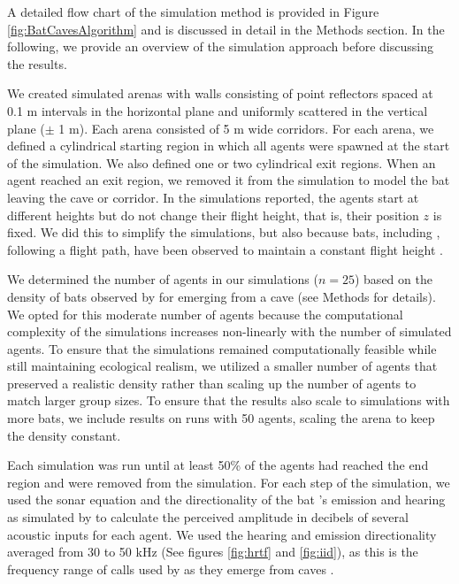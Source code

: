\documentclass[a4paper, 11pt]{article}
\begin{document}
A detailed flow chart of the simulation method is provided in Figure \ref{fig:BatCavesAlgorithm} and is discussed in detail in the Methods section. In the following, we provide an overview of the simulation approach before discussing the results.

We created simulated arenas with walls consisting of point reflectors spaced at 0.1 m intervals in the horizontal plane and uniformly scattered in the vertical plane ($\pm$ 1 m). Each arena consisted of 5 m wide corridors. For each arena, we defined a cylindrical starting region in which all agents were spawned at the start of the simulation. We also defined one or two cylindrical exit regions. When an agent reached an exit region, we removed it from the simulation to model the bat leaving the cave or corridor. In the simulations reported, the agents start at different heights but do not change their flight height, that is, their position $z$ is fixed. We did this to simplify the simulations, but also because bats, including  \citep{Kloepper2017}, following a flight path, have been observed to maintain a constant flight height \citep{Schaub2007}.

We determined the number of agents in our simulations ($n=25$) based on the density of bats observed by \citet{Weesner2023} for  emerging from a cave (see Methods for details). We opted for this moderate number of agents because the computational complexity of the simulations increases non-linearly with the number of simulated agents. To ensure that the simulations remained computationally feasible while still maintaining ecological realism, we utilized a smaller number of agents that preserved a realistic density rather than scaling up the number of agents to match larger group sizes. To ensure that the results also scale to simulations with more bats, we include results on runs with 50 agents, scaling the arena to keep the density constant.

Each simulation was run until at least 50\% of the agents had reached the end region and were removed from the simulation. For each step of the simulation, we used the sonar equation \citep{Urick1983} and the directionality of the bat 's emission and hearing as simulated by \citet{Vanderelst2010} to calculate the perceived amplitude in decibels of several acoustic inputs for each agent. We used the hearing and emission directionality averaged from 30 to 50 kHz (See figures \ref{fig:hrtf} and \ref{fig:iid}), as this is the frequency range of calls used by  as they emerge from caves \citep{Kloepper2018}.
\end{document}
